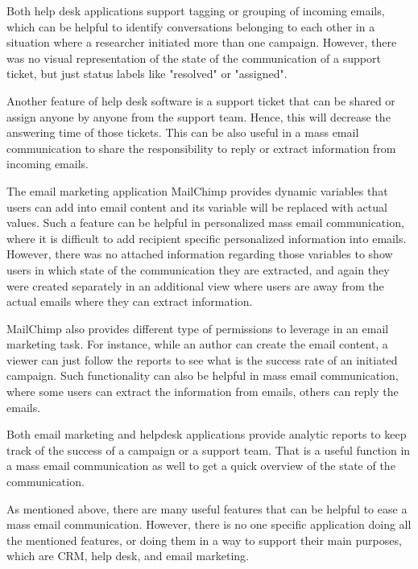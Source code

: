 \begin{compactitem}
	\item Both help desk applications support tagging or grouping of incoming emails, which can be helpful to identify conversations belonging to each other in a situation where a researcher initiated more than one campaign. However, there was no visual representation of the state of the communication of a support ticket, but just status labels like "resolved" or "assigned".
	\item Another feature of help desk software is a support ticket that can be shared or assign anyone by anyone from the support team. Hence, this will decrease the answering time of those tickets. This can be also useful in a mass email communication to share the responsibility to reply or extract information from incoming emails.
	\item The email marketing application MailChimp provides dynamic variables that users can add into email content and its variable will be replaced with actual values. Such a feature can be helpful in personalized mass email communication, where it is difficult to add recipient specific personalized information into emails. However, there was no attached information regarding those variables to show users in which state of the communication they are extracted, and again they were created separately in an additional view where users are away from the actual emails where they can extract information.
	\item MailChimp also provides different type of permissions to leverage in an email marketing task. For instance, while an author can create the email content, a viewer can just follow the reports to see what is the success rate of an initiated campaign. Such functionality can also be helpful in mass email communication, where some users can extract the information from emails, others can reply the emails.
	\item Both email marketing and helpdesk applications provide analytic reports to keep track of the success of a campaign or a support team. That is a useful function in a mass email communication as well to get a quick overview of the state of the communication.
\end{compactitem}

As mentioned above, there are many useful features that can be helpful to ease a mass email communication. However, there is no one specific application doing all the mentioned features, or doing them in a way to support their main purposes, which are \ac{CRM}, help desk, and email marketing.

